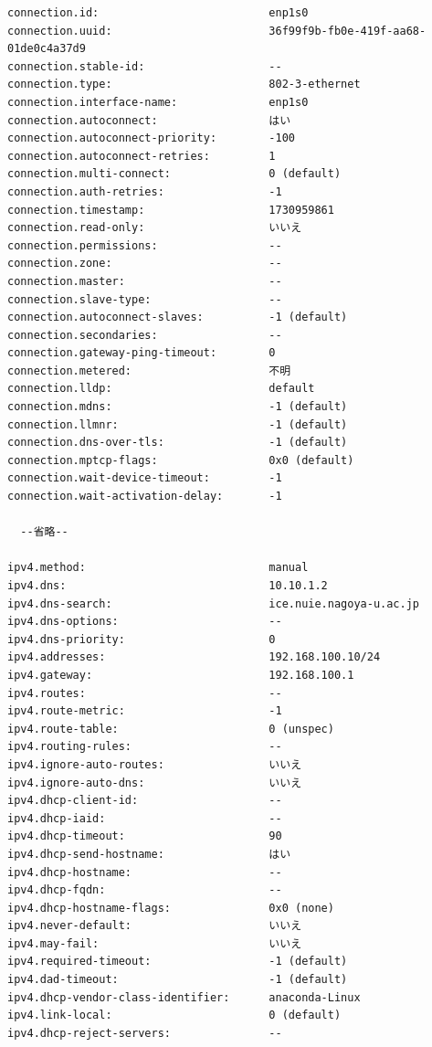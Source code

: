 \documentclass{ltjsarticle} %
\begin{document}
\begin{mdframed}
  \begin{verbatim}
connection.id:                          enp1s0
connection.uuid:                        36f99f9b-fb0e-419f-aa68-01de0c4a37d9
connection.stable-id:                   --
connection.type:                        802-3-ethernet
connection.interface-name:              enp1s0
connection.autoconnect:                 はい
connection.autoconnect-priority:        -100
connection.autoconnect-retries:         1
connection.multi-connect:               0 (default)
connection.auth-retries:                -1
connection.timestamp:                   1730959861
connection.read-only:                   いいえ
connection.permissions:                 --
connection.zone:                        --
connection.master:                      --
connection.slave-type:                  --
connection.autoconnect-slaves:          -1 (default)
connection.secondaries:                 --
connection.gateway-ping-timeout:        0
connection.metered:                     不明
connection.lldp:                        default
connection.mdns:                        -1 (default)
connection.llmnr:                       -1 (default)
connection.dns-over-tls:                -1 (default)
connection.mptcp-flags:                 0x0 (default)
connection.wait-device-timeout:         -1
connection.wait-activation-delay:       -1

  --省略--
  
ipv4.method:                            manual
ipv4.dns:                               10.10.1.2
ipv4.dns-search:                        ice.nuie.nagoya-u.ac.jp
ipv4.dns-options:                       --
ipv4.dns-priority:                      0
ipv4.addresses:                         192.168.100.10/24
ipv4.gateway:                           192.168.100.1
ipv4.routes:                            --
ipv4.route-metric:                      -1
ipv4.route-table:                       0 (unspec)
ipv4.routing-rules:                     --
ipv4.ignore-auto-routes:                いいえ
ipv4.ignore-auto-dns:                   いいえ
ipv4.dhcp-client-id:                    --
ipv4.dhcp-iaid:                         --
ipv4.dhcp-timeout:                      90
ipv4.dhcp-send-hostname:                はい
ipv4.dhcp-hostname:                     --
ipv4.dhcp-fqdn:                         --
ipv4.dhcp-hostname-flags:               0x0 (none)
ipv4.never-default:                     いいえ
ipv4.may-fail:                          いいえ
ipv4.required-timeout:                  -1 (default)
ipv4.dad-timeout:                       -1 (default)
ipv4.dhcp-vendor-class-identifier:      anaconda-Linux
ipv4.link-local:                        0 (default)
ipv4.dhcp-reject-servers:               --
  

\end{verbatim}
\end{mdframed}
\end{document}
